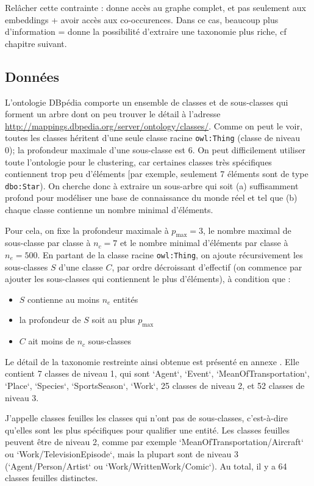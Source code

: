 Relâcher cette contrainte : donne accès au graphe complet, et pas seulement aux embeddings + avoir accès aux co-occurences. Dans ce cas, beaucoup plus d'information = donne la possibilité d'extraire une taxonomie plus riche, cf chapitre suivant.

\subsection{Données}
\label{sec:te-data}

L'ontologie DBpédia comporte un ensemble de classes et de sous-classes qui forment un arbre dont on peu trouver le détail à l'adresse \href{http://mappings.dbpedia.org/server/ontology/classes/}{http://mappings.dbpedia.org/server/ontology/classes/}. Comme on peut le voir, toutes les classes héritent d'une seule classe racine \texttt{owl:Thing} (classe de niveau 0); la profondeur maximale d'une sous-classe est 6. On peut difficilement utiliser toute l'ontologie pour le clustering, car certaines classes très spécifiques contiennent trop peu d'éléments [par exemple, seulement 7 éléments sont de type \texttt{dbo:Star}). On cherche donc à extraire un sous-arbre qui soit (a) suffisamment profond pour modéliser une base de connaissance du monde réel et tel que (b) chaque classe contienne un nombre minimal d'éléments. 

Pour cela, on fixe la profondeur maximale à $p_\max=3$, le nombre maximal de sous-classe par classe à $n_c=7$ et le nombre minimal d'éléments par classe à $n_e=500$. En partant de la classe racine \texttt{owl:Thing}, on ajoute récursivement les sous-classes $S$ d'une classe $C$, par ordre décroissant d'effectif (on commence par ajouter les sous-classes qui contiennent le plus d'éléments), à condition que : 
\begin{itemize}
    \item $S$ contienne au moins $n_e$ entités
    \item la profondeur de $S$ soit au plus $p_\max$
    \item $C$ ait moins de $n_c$ sous-classes
\end{itemize}

Le détail de la taxonomie restreinte ainsi obtenue est présenté en annexe . Elle contient 7 classes de niveau 1, qui sont `Agent`, `Event`, `MeanOfTransportation`, `Place`, `Species`, `SportsSeason`, `Work`, 25 classes de niveau 2, et 52 classes de niveau 3. 

J'appelle classes feuilles les classes qui n'ont pas de sous-classes, c'est-à-dire qu'elles sont les plus spécifiques pour qualifier une entité. Les classes feuilles peuvent être de niveau 2, comme par exemple `MeanOfTransportation/Aircraft` ou  `Work/TelevisionEpisode`, mais la plupart sont de niveau 3 (`Agent/Person/Artist` ou `Work/WrittenWork/Comic`). Au total, il y a 64 classes feuilles distinctes.

